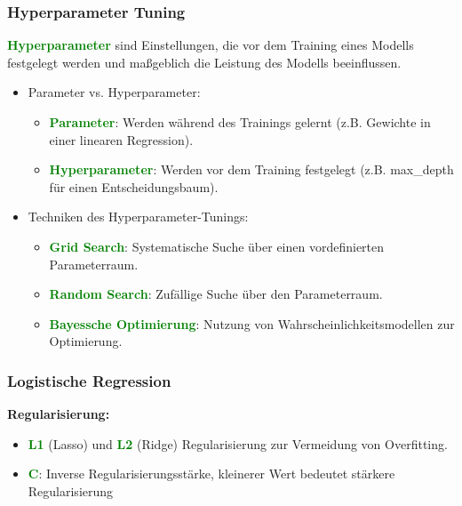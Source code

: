 \documentclass[10pt]{beamer}
\newcommand{\htgreen}[1] {{\bf \textcolor{Green}{#1}}}
\begin{document}
\begin{frame}
  \frametitle{Hyperparameter Tuning}
  {\bf \textcolor{Green}{Hyperparameter} }
  sind Einstellungen, die vor dem Training eines Modells
  festgelegt werden und maßgeblich die Leistung des Modells beeinflussen.

  \vspace{0.5cm}

  \begin{itemize}
    \item Parameter vs. Hyperparameter:
    \begin{itemize}
        \item {\bf \textcolor{Green}{Parameter}}: Werden während des Trainings
          gelernt (z.B. Gewichte in einer linearen Regression).
        \item {\bf \textcolor{Green}{Hyperparameter}}: Werden vor dem
          Training festgelegt (z.B. max\_depth für einen Entscheidungsbaum).
    \end{itemize}

    \vspace{0.5cm}

    \item Techniken des Hyperparameter-Tunings:
    \begin{itemize}
        \item \htgreen{Grid Search}: Systematische Suche über einen vordefinierten 
          Parameterraum.
        \item \htgreen{Random Search}: Zufällige Suche über den Parameterraum.
        \item \htgreen{Bayessche Optimierung}: Nutzung von 
          Wahrscheinlichkeitsmodellen zur Optimierung.
    \end{itemize}
  \end{itemize}

    
\end{frame}

\begin{frame}
  \frametitle{Logistische Regression}
  {\bf Regularisierung: }
    \begin{itemize}
      \item {\bf \textcolor{Green}{L1}} (Lasso) und \htgreen{L2} (Ridge)
          Regularisierung zur Vermeidung von Overfitting.
        \item {\bf \textcolor{Green}{C}}: Inverse Regularisierungsstärke,
          kleinerer Wert bedeutet stärkere Regularisierung
    \end{itemize}
\end{frame}
\end{document}

